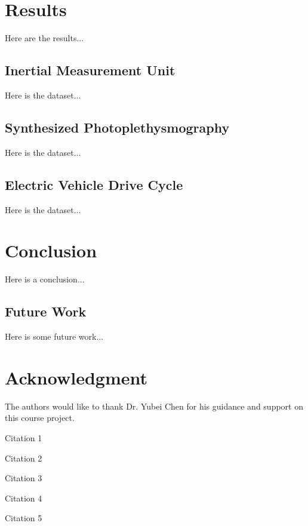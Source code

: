 \documentclass[conference]{IEEEtran}
\begin{document}
\section{Results}
Here are the results...

\subsection{Inertial Measurement Unit}
Here is the dataset...

\subsection{Synthesized Photoplethysmography}
Here is the dataset...

\subsection{Electric Vehicle Drive Cycle}
Here is the dataset...


\section{Conclusion}%
Here is a conclusion...

\subsection{Future Work}
Here is some future work...

\section*{Acknowledgment}
The authors would like to thank Dr. Yubei Chen for his guidance and support on this course project.

\begin{thebibliography}{1}


Citation 1

Citation 2

Citation 3

Citation 4

Citation 5

\end{thebibliography}
\end{document}
